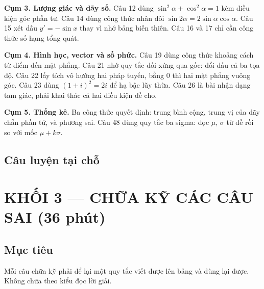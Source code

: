 \documentclass[11pt, a4paper]{article}
\begin{document}
\textbf{Cụm 3. Lượng giác và dãy số.} Câu 12 dùng $\sin^2\alpha + \cos^2\alpha = 1$ kèm điều kiện góc phần tư. Câu 14 dùng công thức nhân đôi $\sin 2\alpha = 2\sin\alpha\cos\alpha$. Câu 15 xét dấu $y' = -\sin x$ thay vì nhớ bảng biến thiên. Câu 16 và 17 chỉ cần công thức số hạng tổng quát.

\textbf{Cụm 4. Hình học, vector và số phức.} Câu 19 dùng công thức khoảng cách từ điểm đến mặt phẳng. Câu 21 nhớ quy tắc đối xứng qua gốc: đổi dấu cả ba tọa độ. Câu 22 lấy tích vô hướng hai pháp tuyến, bằng 0 thì hai mặt phẳng vuông góc. Câu 23 dùng $(1+i)^2 = 2i$ để hạ bậc lũy thừa. Câu 26 là bài nhận dạng tam giác, phải khai thác cả hai điều kiện đề cho.

\textbf{Cụm 5. Thống kê.} Ba công thức quyết định: trung bình cộng, trung vị của dãy chẵn phần tử, và phương sai. Câu 48 dùng quy tắc ba sigma: đọc $\mu$, $\sigma$ từ đề rồi so với mốc $\mu + k\sigma$.

\subsection{Câu luyện tại chỗ}


\section{KHỐI 3 — CHỮA KỸ CÁC CÂU SAI (36 phút)}

\subsection{Mục tiêu}

Mỗi câu chữa kỹ phải để lại một quy tắc viết được lên bảng và dùng lại được. Không chữa theo kiểu đọc lời giải.
\end{document}
